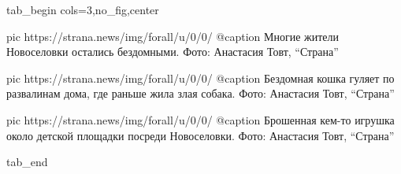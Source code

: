  
 
 
 
 

\ifcmt
  tab_begin cols=3,no_fig,center

     pic https://strana.news/img/forall/u/0/0/%
		 @caption Многие жители Новоселовки остались бездомными. Фото: Анастасия Товт, \enquote{Страна}

		 pic https://strana.news/img/forall/u/0/0/%
		 @caption Бездомная кошка гуляет по развалинам дома, где раньше жила злая собака. Фото: Анастасия Товт, \enquote{Страна}

		 pic https://strana.news/img/forall/u/0/0/%
		 @caption Брошенная кем-то игрушка около детской площадки посреди Новоселовки. Фото: Анастасия Товт, \enquote{Страна}

  tab_end
\fi
